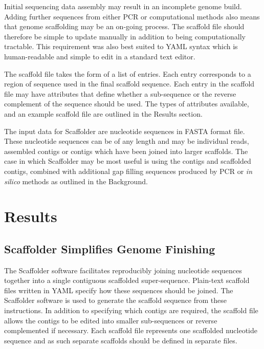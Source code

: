 \documentclass[10pt]{bmc_article}
\newenvironment{bmcformat}{\begin{raggedright}\baselineskip20pt\sloppy\setboolean{publ}{false}}{\end{raggedright}\baselineskip20pt\sloppy}
\begin{document}
\begin{bmcformat}
Initial sequencing data assembly may result in an incomplete genome build.
Adding further sequences from either PCR or computational methods also means
that genome scaffolding may be an on-going process. The scaffold file should
therefore be simple to update manually in addition to being computationally
tractable. This requirement was also best suited to YAML syntax which is
human-readable and simple to edit in a standard text editor. \pb

The scaffold file takes the form of a list of entries. Each entry corresponds
to a region of sequence used in the final scaffold sequence. Each entry in the
scaffold file may have attributes that define whether a sub-sequence or the
reverse complement of the sequence should be used. The types of attributes
available, and an example scaffold file are outlined in the Results section.
\pb

The input data for Scaffolder are nucleotide sequences in FASTA format file.
These nucleotide sequences can be of any length and may be individual reads,
assembled contigs or contigs which have been joined into larger scaffolds. The
case in which Scaffolder may be most useful is using the contigs and scaffolded
contigs, combined with additional gap filling sequences produced by PCR or
\emph{in silico} methods as outlined in the Background. \pb

\clearpage

\section*{Results} %

\subsection*{Scaffolder Simplifies Genome Finishing} %

The Scaffolder software facilitates reproducibly joining nucleotide sequences
together into a single contiguous scaffolded super-sequence. Plain-text
scaffold files written in YAML specify how these sequences should be joined.
The Scaffolder software is used to generate the scaffold sequence from these
instructions. In addition to specifying which contigs are required, the
scaffold file allows the contigs to be edited into smaller sub-sequences or
reverse complemented if necessary. Each scaffold file represents one scaffolded
nucleotide sequence and as such separate scaffolds should be defined in
separate files. \pb


\end{bmcformat}
\end{document}
